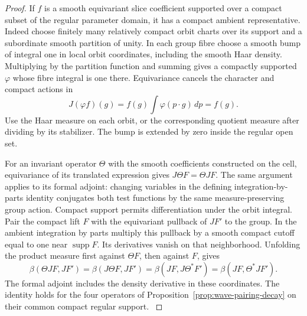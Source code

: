 \begin{proof}
If \(f\) is a smooth equivariant slice coefficient supported over a compact subset of the regular parameter domain, it has a compact ambient representative. Indeed choose finitely many relatively compact orbit charts over its support and a subordinate smooth partition of unity. In each group fibre choose a smooth bump of integral one in local orbit coordinates, including the smooth Haar density. Multiplying by the partition function and summing gives a compactly supported \(\varphi\) whose fibre integral is one there. Equivariance cancels the character and compact actions in
\[
 J(\varphi f)(g)=f(g)\int\varphi(p\cdot g)\,dp=f(g).
\]
Use the Haar measure on each orbit, or the corresponding quotient measure after dividing by its stabilizer. The bump is extended by zero inside the regular open set.

For an invariant operator \(\Theta\) with the smooth coefficients constructed on the cell, equivariance of its translated expression gives \(J\Theta F=\Theta JF\). The same argument applies to its formal adjoint: changing variables in the defining integration-by-parts identity conjugates both test functions by the same measure-preserving group action. Compact support permits differentiation under the orbit integral. Pair the compact lift \(F\) with the equivariant pullback of \(JF'\) to the group. In the ambient integration by parts multiply this pullback by a smooth compact cutoff equal to one near \(\operatorname{supp} F\). Its derivatives vanish on that neighborhood. Unfolding the product measure first against \(\Theta F\), then against \(F\), gives
\[
 \beta(\Theta JF,JF')=\beta(J\Theta F,JF')
       =\beta(JF,J\Theta^*F')=\beta(JF,\Theta^*JF').
\]
The formal adjoint includes the density derivative in these coordinates. The identity holds for the four operators of Proposition~\ref{prop:wave-pairing-decay} on their common compact regular support. \label{cor:word-pairing-4}

\end{proof}

